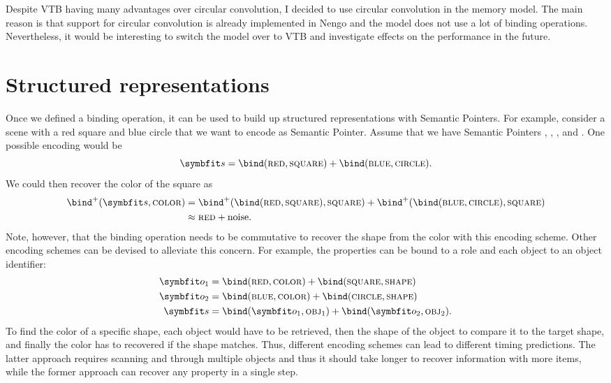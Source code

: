 Despite VTB having many advantages over circular convolution, I decided to use circular convolution in the memory model.
The main reason is that support for circular convolution is already implemented in Nengo and the model does not use a lot of binding operations.
Nevertheless, it would be interesting to switch the model over to VTB and investigate effects on the performance in the future.


\section{Structured representations}
Once we defined a binding operation, it can be used to build up structured representations with Semantic Pointers.
For example, consider a scene with a red square and blue circle that we want to encode as Semantic Pointer.
Assume that we have Semantic Pointers , , , and .
One possible encoding would be
\begin{equation}
    \vc s = \bind(\spc{red}, \spc{square}) + \bind(\spc{blue}, \spc{circle}) \text{.}
\end{equation}
We could then recover the color of the square as
\begin{align}
    \bind^+(\vc s, \spc{color}) &= \bind^+(\bind(\spc{red}, \spc{square}), \spc{square}) + \bind^+(\bind(\spc{blue}, \spc{circle}), \spc{square}) \\
    &\approx \spc{red} + \mathrm{noise} \text{.}
\end{align}
Note, however, that the binding operation needs to be commutative to recover the shape from the color with this encoding scheme.
Other encoding schemes can be devised to alleviate this concern.
For example, the properties can be bound to a role and each object to an object identifier:
\begin{align}
    \vc o_1 &= \bind(\spc{red}, \spc{color}) + \bind(\spc{square}, \spc{shape}) \\
    \vc o_2 &= \bind(\spc{blue}, \spc{color}) + \bind(\spc{circle}, \spc{shape}) \\
    \vc s &= \bind(\vc o_1, \spc{obj}_1) + \bind(\vc o_2, \spc{obj}_2) \text{.}
\end{align}
To find the color of a specific shape, each object would have to be retrieved, then the shape of the object to compare it to the target shape, and finally the color has to recovered if the shape matches.
Thus, different encoding schemes can lead to different timing predictions.
The latter approach requires scanning and through multiple objects and thus it should take longer to recover information with more items, while the former approach can recover any property in a single step.
